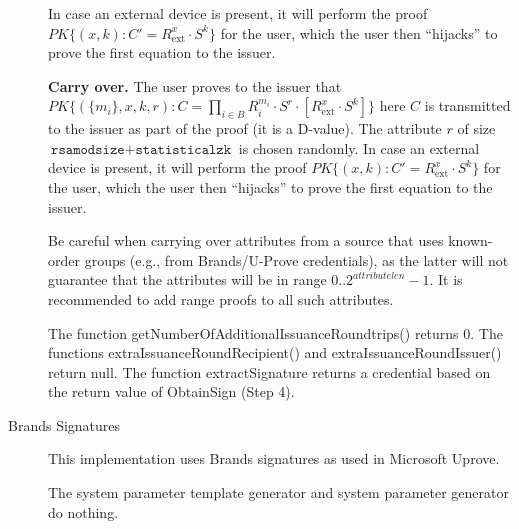 \begin{description}
    In case an external device is present, it will perform the proof
    $\mathit{PK}\lbrace (x, k): C' = R_\textrm{ext}^x \cdot S^k\rbrace$ for the user,
    which the user then ``hijacks'' to prove the first equation to the issuer.

    \textbf{Carry over.}
    The user proves to the issuer that
    $\mathit{PK}\lbrace (\lbrace m_i\rbrace, x, k, r) : C=\prod_{i\in B}R_i^{m_i} \cdot S^r \cdot [R_\textrm{ext}^x \cdot S^k] \rbrace$
    here $C$ is transmitted to the issuer as part of the proof (it is a D-value).
    The attribute $r$ of size $\texttt{rsamodsize}+\texttt{statisticalzk}$ is chosen randomly.
    In case an external device is present, it will perform the proof
    $\mathit{PK}\lbrace (x, k): C' = R_\textrm{ext}^x \cdot S^k\rbrace$ for the user,
    which the user then ``hijacks'' to prove the first equation to the issuer.

    Be careful when carrying over attributes from a source that uses known-order groups (e.g., from Brands/U-Prove credentials),
    as the latter will not guarantee that the attributes will be in range 0..$2^{attributelen}-1$. It is
    recommended to add range proofs to all such attributes.

    The function getNumberOfAdditionalIssuanceRoundtrips() returns 0. The functions extraIssuanceRoundRecipient()
	 and extraIssuanceRoundIssuer() return null. The function extractSignature returns a credential based on the return value
	 of \textsf{ObtainSign} (Step 4).



\item[Brands Signatures]

    This implementation uses Brands signatures as used in Microsoft Uprove.

    The system parameter template generator and system parameter generator do nothing.


\end{description}
